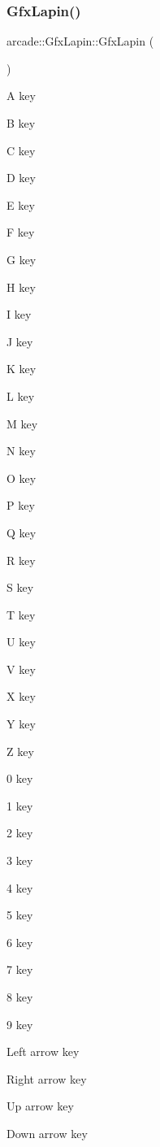 \mbox{\label{classarcade_1_1_gfx_lapin_a23c348cc21e8b935c1922bc68b1950fb}} 
\subsubsection{\texorpdfstring{Gfx\+Lapin()}{GfxLapin()}}
{\footnotesize\ttfamily arcade\+::\+Gfx\+Lapin\+::\+Gfx\+Lapin (\begin{DoxyParamCaption}{ }\end{DoxyParamCaption})}

A key

B key

C key

D key

E key

F key

G key

H key

I key

J key

K key

L key

M key

N key

O key

P key

Q key

R key

S key

T key

U key

V key

X key

Y key

Z key

0 key

1 key

2 key

3 key

4 key

5 key

6 key

7 key

8 key

9 key

Left arrow key

Right arrow key

Up arrow key

Down arrow key

